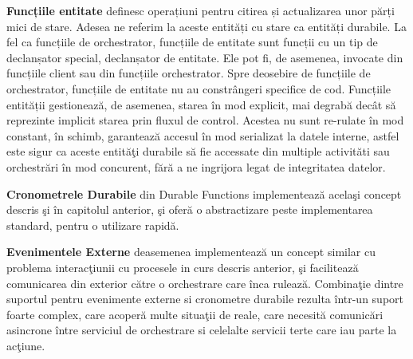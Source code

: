 \documentclass[a4paper,12pt]{report}
\begin{document}
\par \textbf{Funcțiile entitate} definesc operațiuni pentru citirea și actualizarea unor părți mici de stare. Adesea ne referim la aceste entități cu stare ca entități durabile. La fel ca funcțiile de orchestrator, funcțiile de entitate sunt funcții cu un tip de declanșator special, declanșator de entitate. Ele pot fi, de asemenea, invocate din funcțiile client sau din funcțiile orchestrator. Spre deosebire de funcțiile de orchestrator, funcțiile de entitate nu au constrângeri specifice de cod. Funcțiile entității gestionează, de asemenea, starea în mod explicit, mai degrabă decât să reprezinte implicit starea prin fluxul de control. Acestea nu sunt re-rulate în mod constant, în schimb, garantează accesul în mod serializat la datele interne, astfel este sigur ca aceste entităţi durabile să fie accessate din multiple activităti sau orchestrări în mod concurent, fără a ne ingrijora legat de integritatea datelor. 
\par \textbf{Cronometrele Durabile} din Durable Functions implementează acelaşi concept descris şi în capitolul anterior, şi oferă o abstractizare peste implementarea standard, pentru o utilizare rapidă. 
\par \textbf{Evenimentele Externe} deasemenea implementează un concept similar cu problema interacţiunii cu procesele in curs descris anterior, şi facilitează comunicarea din exterior către o orchestrare care înca rulează. Combinaţie dintre suportul pentru evenimente externe si cronometre durabile rezulta într-un suport foarte complex, care acoperă multe situaţii de reale, care necesită comunicări asincrone între serviciul de orchestrare si celelalte servicii terte care iau parte la acţiune. 
\end{document}
